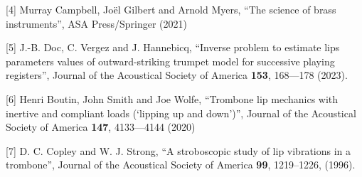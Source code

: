   [4] Murray Campbell, Joël Gilbert and Arnold Myers, “The science of brass 
  instruments”, ASA Press/Springer (2021) 

  [5] J.-B. Doc, C. Vergez and J. Hannebicq, “Inverse problem to estimate lips 
  parameters values of outward-striking trumpet model for successive playing 
  registers”, Journal of the Acoustical Society of America \textbf{153}, 
  168—178 (2023). 

  [6] Henri Boutin, John Smith and Joe Wolfe, “Trombone lip mechanics with 
  inertive and compliant loads (‘lipping up and down’)”, Journal of the 
  Acoustical Society of America \textbf{147}, 4133—4144 (2020) 

  [7] D. C. Copley and W. J. Strong, “A stroboscopic study of lip vibrations in 
  a trombone”, Journal of the Acoustical Society of America \textbf{99}, 
  1219–1226, (1996). 